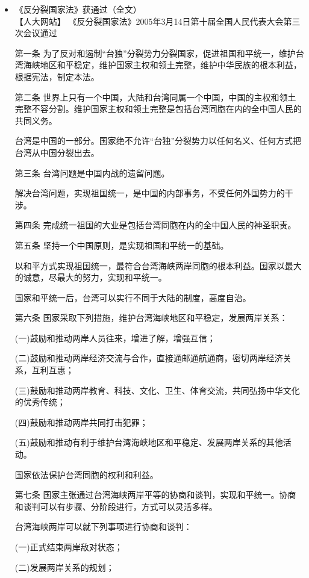 \documentclass[a4paper,11pt]{article}
\begin{document}
  
\begin{itemize}

\item 《反分裂国家法》获通过（全文）\\
\label{sec-2_1}%
【人大网站】 《反分裂国家法》2005年3月14日第十届全国人民代表大会第三次会议通过

   第一条 为了反对和遏制“台独”分裂势力分裂国家，促进祖国和平统一，维护台湾海峡地区和平稳定，维护国家主权和领土完整，维护中华民族的根本利益，根据宪法，制定本法。

   第二条 世界上只有一个中国，大陆和台湾同属一个中国，中国的主权和领土完整不容分割。维护国家主权和领土完整是包括台湾同胞在内的全中国人民的共同义务。

   台湾是中国的一部分。国家绝不允许“台独”分裂势力以任何名义、任何方式把台湾从中国分裂出去。

   第三条 台湾问题是中国内战的遗留问题。

   解决台湾问题，实现祖国统一，是中国的内部事务，不受任何外国势力的干涉。

   第四条 完成统一祖国的大业是包括台湾同胞在内的全中国人民的神圣职责。

   第五条 坚持一个中国原则，是实现祖国和平统一的基础。

   以和平方式实现祖国统一，最符合台湾海峡两岸同胞的根本利益。国家以最大的诚意，尽最大的努力，实现和平统一。

   国家和平统一后，台湾可以实行不同于大陆的制度，高度自治。

   第六条 国家采取下列措施，维护台湾海峡地区和平稳定，发展两岸关系：

   (一)鼓励和推动两岸人员往来，增进了解，增强互信；

   (二)鼓励和推动两岸经济交流与合作，直接通邮通航通商，密切两岸经济关系，互利互惠；

   (三)鼓励和推动两岸教育、科技、文化、卫生、体育交流，共同弘扬中华文化的优秀传统；

   (四)鼓励和推动两岸共同打击犯罪；

   (五)鼓励和推动有利于维护台湾海峡地区和平稳定、发展两岸关系的其他活动。

   国家依法保护台湾同胞的权利和利益。

   第七条 国家主张通过台湾海峡两岸平等的协商和谈判，实现和平统一。协商和谈判可以有步骤、分阶段进行，方式可以灵活多样。

   台湾海峡两岸可以就下列事项进行协商和谈判：

   (一)正式结束两岸敌对状态；

   (二)发展两岸关系的规划；


\end{itemize}
\end{document}

